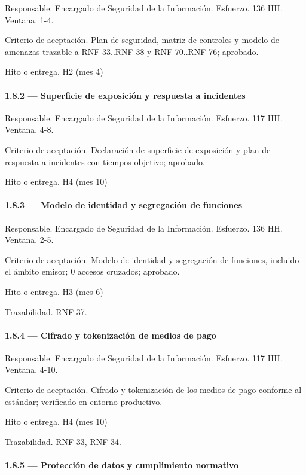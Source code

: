 \documentclass[11pt]{article}
\begin{document}
Responsable. Encargado de Seguridad de la Información. Esfuerzo. 136 HH. Ventana. 1-4.

Criterio de aceptación. Plan de seguridad, matriz de controles y modelo de amenazas trazable a RNF-33..RNF-38 y RNF-70..RNF-76; aprobado.

Hito o entrega. H2 (mes 4)

\paragraph{1.8.2 — Superficie de exposición y respuesta a incidentes}

Responsable. Encargado de Seguridad de la Información. Esfuerzo. 117 HH. Ventana. 4-8.

Criterio de aceptación. Declaración de superficie de exposición y plan de respuesta a incidentes con tiempos objetivo; aprobado.

Hito o entrega. H4 (mes 10)

\paragraph{1.8.3 — Modelo de identidad y segregación de funciones}

Responsable. Encargado de Seguridad de la Información. Esfuerzo. 136 HH. Ventana. 2-5.

Criterio de aceptación. Modelo de identidad y segregación de funciones, incluido el ámbito emisor; 0 accesos cruzados; aprobado.

Hito o entrega. H3 (mes 6)

Trazabilidad. RNF-37.

\paragraph{1.8.4 — Cifrado y tokenización de medios de pago}

Responsable. Encargado de Seguridad de la Información. Esfuerzo. 117 HH. Ventana. 4-10.

Criterio de aceptación. Cifrado y tokenización de los medios de pago conforme al estándar; verificado en entorno productivo.

Hito o entrega. H4 (mes 10)

Trazabilidad. RNF-33, RNF-34.

\paragraph{1.8.5 — Protección de datos y cumplimiento normativo}
\end{document}

